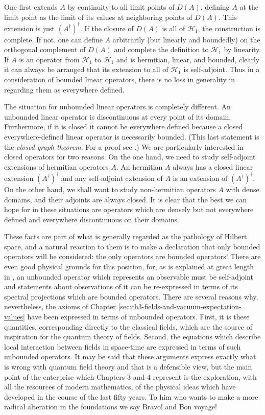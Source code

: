 One first extends $A$ by continuity to all limit points of $D(A)$, defining
$A$ at the limit point as the limit of its values at neighboring points of
$D(A)$.  This extension is just $(A^\dagger)^\dagger$.  If the closure of
$D(A)$ is all of $\mathcal{H}_1$, the construction is complete.  If not, one
can define $A$ arbitrarily (but linearly and boundedly) on the orthogonal
complement of $D(A)$ and complete the definition to $\mathcal{H}_1$ by
linearity.  If $A$ is an operator from $\mathcal{H}_1$ to $\mathcal{H}_1$ and
is hermitian, linear, and bounded, clearly it can always be arranged that
its extension to all of $\mathcal{H}_1$ is self-adjoint.  Thus in a
consideration of bounded linear operators, there is no loss in generality in
regarding them as everywhere defined.

The situation for unbounded linear operators is completely different.  An
unbounded linear operator is discontinuous at every point of its domain.
Furthermore, if it is closed it cannot be everywhere defined because a closed
everywhere-defined linear operator is necessarily bounded.  (This last
statement is the \emph{closed graph theorem}. For a proof see \cite{pct-21}.) We
are particularly interested in closed operators for two reasons.  On the one
hand, we need to study self-adjoint extensions of hermitian operators $A$.  An
hermitian $A$ always has a closed linear extension $(A^\dagger)^\dagger$ and
any self-adjoint extension of $A$ is an extension of $(A^\dagger)^\dagger$.
On the other hand, we shall want to study non-hermitian operators $A$ with
dense domains, and their adjoints are always closed.  It is clear that the
best we can hope for in these situations are operators which are densely but
not everywhere defined and everywhere discontinuous on their domains.

These facts are part of what is generally regarded as the pathology of
Hilbert space, and a natural reaction to them is to make a declaration that
only bounded operators will be considered: the only operators are bounded
operators!  There are even good physical grounds for this position, for, as is
explained at great length in \cite{pct-20}, an unbounded operator which represents
an observable must be self-adjoint and statements about observations of it can
be re-expressed in terms of its spectral projections which are bounded
operators.  There are several reasons why, nevertheless, the axioms of
Chapter \ref{sec:ch3-fields-and-vacuum-expectation-values} have been expressed in terms of unbounded operators.  First, it is
these quantities, corresponding directly to the classical fields, which are
the source of inspiration for the quantum theory of fields.  Second, the
equations which describe local interaction between fields in space-time are
expressed in terms of such unbounded operators.  It may be said that these
arguments express exactly what is wrong with quantum field theory and that is
a defensible view, but the main point of the enterprise which Chapters 3 and 4
represent is the exploration, with all the resources of modern mathematics,
of the physical ideas which have developed in the course of the last fifty
years.  To him who wants to make a more radical alteration in the foundations
we say Bravo! and Bon voyage!

